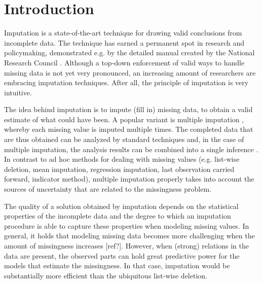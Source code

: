 \documentclass[bimj,fleqn]{w-art}
\begin{document}






\section{Introduction}

Imputation is a state-of-the-art technique for drawing valid conclusions from incomplete data. The technique has earned a permanent spot in research and policymaking, demonstrated e.g. by the detailed manual created by the National Research Council \citep*{little2012prevention}. Although a top-down enforcement of valid ways to handle missing data is not yet very pronounced, an increasing amount of researchers are embracing imputation techniques. After all, the principle of imputation is very intuitive.

The idea behind imputation is to impute (fill in) missing data, to obtain a valid estimate of what could have been. A popular variant is multiple imputation \citep{rubi76}, whereby each missing value is imputed multiple times. The completed data that are thus obtained can be analyzed by standard techniques and, in the case of multiple imputation, the analysis results can be combined into a single inference \citep[using Rubin's rules][]{rubi87}. In contrast to ad hoc methods for dealing with missing values (e.g. list-wise deletion, mean imputation, regression imputation, last observation carried forward, indicator method), multiple imputation properly takes into account the sources of uncertainty that are related to the missingness problem. 

The quality of a solution obtained by imputation depends on the statistical properties of the incomplete data and the degree to which an imputation procedure is able to capture these properties when modeling missing values. In general, it holds that modeling missing data becomes more challenging when the amount of missingness increases [ref?]. However, when (strong) relations in the data are present, the observed parts can hold great predictive power for the models that estimate the missingness. In that case, imputation would be substantially more efficient than the ubiquitous list-wise deletion.
\end{document}
